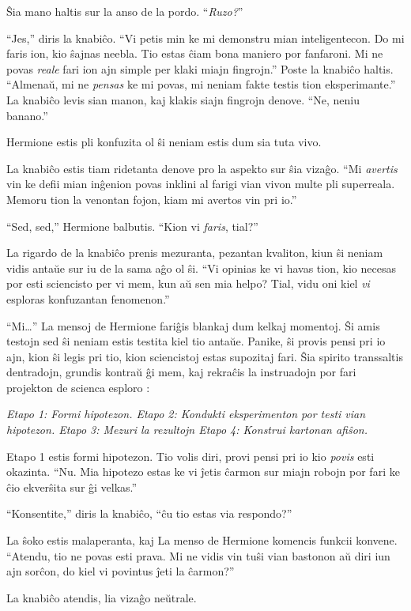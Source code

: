Ŝia mano haltis sur la anso de la pordo. ``\emph{Ruzo?}''

``Jes,'' diris la knabiĉo. ``Vi petis min ke mi demonstru mian
inteligentecon. Do mi faris ion, kio ŝajnas neebla. Tio estas ĉiam
bona maniero por fanfaroni. Mi ne povas \emph{reale} fari ion ajn
simple per klaki miajn fingrojn.'' Poste la knabiĉo haltis. ``Almenaŭ,
mi ne \emph{pensas} ke mi povas, mi neniam fakte testis tion
eksperimante.'' La knabiĉo levis sian manon, kaj klakis siajn fingrojn
denove. ``Ne, neniu banano.''

Hermione estis pli konfuzita ol ŝi neniam estis dum sia tuta vivo.

La knabiĉo estis tiam ridetanta denove pro la aspekto sur ŝia
vizaĝo. ``Mi \emph{avertis} vin ke defii mian inĝenion povas inklini
al farigi vian vivon multe pli superreala. Memoru tion la venontan
fojon, kiam mi avertos vin pri io.''

``Sed, sed,'' Hermione balbutis. ``Kion vi \emph{faris}, tial?''

La rigardo de la knabiĉo prenis mezuranta, pezantan kvaliton, kiun ŝi
neniam vidis antaŭe sur iu de la sama aĝo ol ŝi. ``Vi opinias ke vi
havas tion, kio necesas por esti sciencisto per vi mem, kun aŭ sen mia
helpo? Tial, vidu oni kiel \emph{vi} esploras konfuzantan fenomenon.''

``Mi\ldots'' La mensoj de Hermione fariĝis blankaj dum kelkaj
momentoj. Ŝi amis testojn sed ŝi neniam estis testita kiel tio antaŭe.
Panike, ŝi provis pensi pri io ajn, kion ŝi legis pri tio, kion
sciencistoj estas supozitaj fari. Ŝia spirito transsaltis dentradojn,
grundis kontraŭ ĝi mem, kaj rekraĉis la instruadojn por fari projekton
de scienca esploro :

\emph{Etapo 1: Formi hipotezon. Etapo 2: Kondukti eksperimenton por
testi vian hipotezon. Etapo 3: Mezuri la rezultojn Etapo 4: Konstrui
kartonan afiŝon.}


Etapo 1 estis formi hipotezon. Tio volis diri, provi pensi pri io kio
\emph{povis} esti okazinta. ``Nu. Mia hipotezo estas ke vi ĵetis
ĉarmon sur miajn robojn por fari ke ĉio ekverŝita sur ĝi velkas.''

``Konsentite,'' diris la knabiĉo, ``ĉu tio estas via respondo?''

La ŝoko estis malaperanta, kaj La menso de Hermione komencis funkcii
konvene. ``Atendu, tio ne povas esti prava. Mi ne vidis vin tuŝi vian
bastonon aŭ diri iun ajn sorĉon, do kiel vi povintus ĵeti la ĉarmon?''

La knabiĉo atendis, lia vizaĝo neŭtrale.

